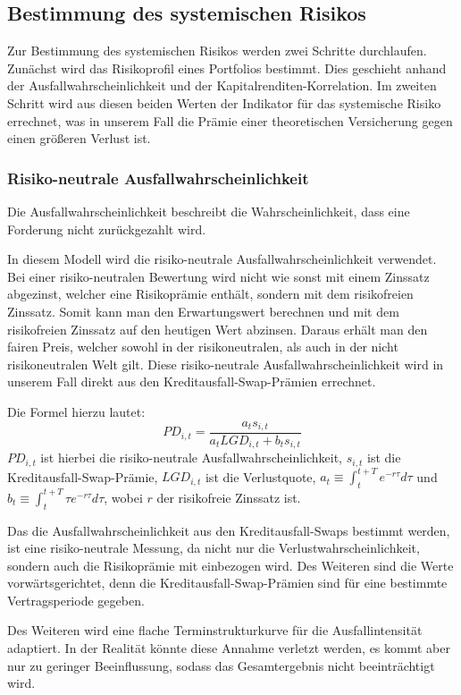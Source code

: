 \documentclass[a4paper,12pt]{scrartcl}
\begin{document}
\subsection{Bestimmung des systemischen Risikos}
Zur Bestimmung des systemischen Risikos werden zwei Schritte durchlaufen. Zunächst wird das Risikoprofil eines Portfolios bestimmt. Dies geschieht anhand der Ausfallwahrscheinlichkeit und der Kapitalrenditen-Korrelation.
Im zweiten Schritt wird aus diesen beiden Werten der Indikator für das systemische Risiko errechnet, was in unserem Fall die Prämie einer theoretischen Versicherung gegen einen größeren Verlust ist.
\subsubsection{Risiko-neutrale Ausfallwahrscheinlichkeit}
Die Ausfallwahrscheinlichkeit beschreibt die Wahrscheinlichkeit, dass eine Forderung nicht zurückgezahlt wird.

In diesem Modell wird die risiko-neutrale Ausfallwahrscheinlichkeit verwendet. Bei einer risiko-neutralen Bewertung wird nicht wie sonst mit einem Zinssatz abgezinst, welcher eine Risikoprämie enthält, sondern mit dem risikofreien Zinssatz. Somit kann man den Erwartungswert berechnen und mit dem risikofreien Zinssatz auf den heutigen Wert abzinsen. Daraus erhält man den fairen Preis, welcher sowohl in der risikoneutralen, als auch in der nicht risikoneutralen Welt gilt.
Diese risiko-neutrale Ausfallwahrscheinlichkeit wird in unserem Fall direkt aus den Kreditausfall-Swap-Prämien errechnet. 

Die Formel hierzu lautet: 
\begin{equation}
PD_{i,t}=\frac{a_t s_{i,t}}{a_t LGD_{i,t}+b_t s_{i,t}}
\end{equation}
$PD_{i,t}$ ist hierbei die risiko-neutrale Ausfallwahrscheinlichkeit, $s_{i,t}$ ist die Kreditausfall-Swap-Prämie, $LGD_{i,t}$ ist die Verlustquote, $a_t \equiv \int_{t}^{t+T} e^{-r \tau}d \tau$ und $b_t \equiv \int_{t}^{t+T} \tau e^{-r \tau}d \tau$, wobei $r$ der risikofreie Zinssatz ist.

Das die Ausfallwahrscheinlichkeit aus den Kreditausfall-Swaps bestimmt werden, ist eine risiko-neutrale Messung, da nicht nur die Verlustwahrscheinlichkeit, sondern auch die Risikoprämie mit einbezogen wird. Des Weiteren sind die Werte vorwärtsgerichtet, denn die Kreditausfall-Swap-Prämien sind für eine bestimmte Vertragsperiode gegeben. 

Des Weiteren wird eine flache Terminstrukturkurve für die Ausfallintensität adaptiert. In der Realität könnte diese Annahme verletzt werden, es kommt aber nur zu geringer Beeinflussung, sodass das Gesamtergebnis nicht beeinträchtigt wird.
\newpage
\end{document}
